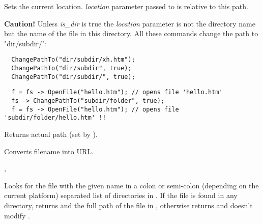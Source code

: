 Sets the current location. {\it location} parameter passed to 
 is relative to this path.

{\bf Caution! } Unless {\it is\_dir} is true the {\it location} parameter
is not the directory name but the name of the file in this directory. All these
commands change the path to "dir/subdir/":

\begin{verbatim}
  ChangePathTo("dir/subdir/xh.htm");
  ChangePathTo("dir/subdir", true);
  ChangePathTo("dir/subdir/", true);
\end{verbatim}





\begin{verbatim}
  f = fs -> OpenFile("hello.htm"); // opens file 'hello.htm'
  fs -> ChangePathTo("subdir/folder", true);
  f = fs -> OpenFile("hello.htm"); // opens file 'subdir/folder/hello.htm' !!
\end{verbatim}


\label{wxfilesystemgetpath}


Returns actual path (set by ).


\label{wxfilesystemfilenametourl}


Converts filename into URL.


,


\label{wxfilesystemfindfileinpath}


Looks for the file with the given name  in a colon or semi-colon
(depending on the current platform) separated list of directories in
. If the file is found in any directory, returns \true and the full
path of the file in , otherwise returns \false and doesn't modify 
.

